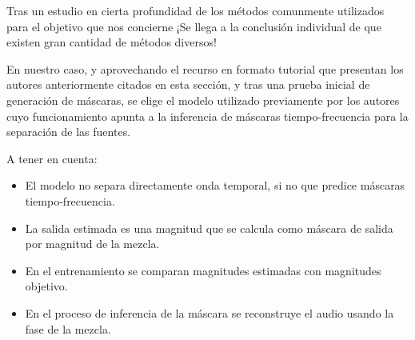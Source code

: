 Tras un estudio en cierta profundidad de los métodos comunmente utilizados para el objetivo que nos concierne ¡Se llega a la conclusión individual de que existen gran cantidad de métodos diversos! \cite{rafii2018overview}

En nuestro caso, y aprovechando el recurso en formato tutorial que presentan los autores anteriormente citados en esta sección, y tras una prueba inicial de generación de máscaras, se elige el modelo utilizado previamente por los autores cuyo funcionamiento apunta a la inferencia de máscaras tiempo-frecuencia para la separación de las fuentes.

A tener en cuenta:
\begin{itemize}
    \item El modelo no separa directamente onda temporal, si no que predice máscaras tiempo-frecuencia.
    \item La salida estimada es una magnitud que se calcula como máscara de salida por magnitud de la mezcla.
    \item En el entrenamiento se comparan magnitudes estimadas con magnitudes objetivo.
    \item En el proceso de inferencia de la máscara se reconstruye el audio usando la fase de la mezcla.
\end{itemize}
